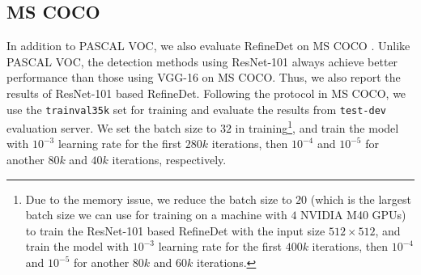 \documentclass[10pt,twocolumn,letterpaper]{article}
\begin{document}
\subsection{MS COCO}
In addition to PASCAL VOC, we also evaluate RefineDet on MS COCO \cite{DBLP:conf/eccv/LinMBHPRDZ14}. Unlike PASCAL VOC, the detection methods using ResNet-101 always achieve better performance than those using VGG-16 on MS COCO. Thus, we also report the results of ResNet-101 based RefineDet. Following the protocol in MS COCO, we use the {\tt trainval35k} set \cite{DBLP:conf/cvpr/BellZBG16} for training and evaluate the results from {\tt test-dev} evaluation server. We set the batch size to $32$ in training\footnote{Due to the memory issue, we reduce the batch size to $20$ (which is the largest batch size we can use for training on a machine with $4$ NVIDIA M40 GPUs) to train the ResNet-101 based RefineDet with the input size $512\times512$, and train the model with $10^{-3}$ learning rate for the first $400k$ iterations, then $10^{-4}$ and $10^{-5}$ for another $80k$ and $60k$ iterations.}, and train the model with $10^{-3}$ learning rate for the first $280k$ iterations, then $10^{-4}$ and $10^{-5}$ for another $80k$ and $40k$ iterations, respectively.
\end{document}
